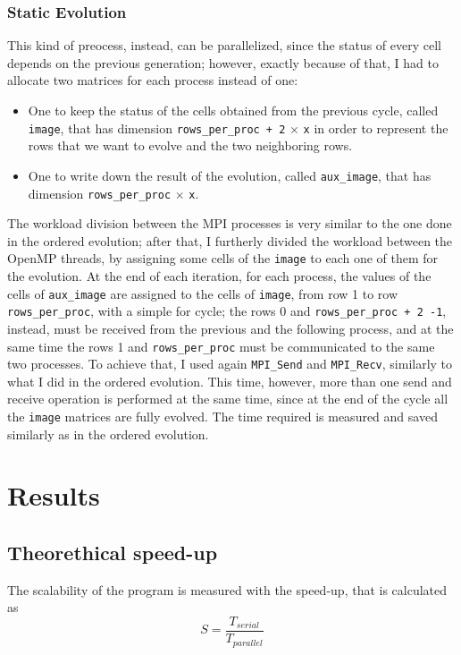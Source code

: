 \documentclass[12pt]{article}
\begin{document}
    \subsubsection{Static Evolution}
    This kind of preocess, instead, can be parallelized, since the status of every cell depends on the previous generation; however, exactly because of that, I had to allocate two matrices for each process instead of one:
    \begin{itemize}
    	\item One to keep the status of the cells obtained from the previous cycle, called \lstinline|image|, that has dimension \lstinline|rows_per_proc + 2| $\times$ \lstinline|x| in order to represent the rows that we want to evolve and the two neighboring rows.
    	\item One to write down the result of the evolution, called \lstinline|aux_image|, that has dimension \lstinline|rows_per_proc| $\times$ \lstinline|x|.
   \end{itemize}
    The workload division between the MPI processes is very  similar to the one done in the ordered evolution; after that, I furtherly divided the workload between the OpenMP threads, by assigning some cells of the \lstinline|image| to each one of them for the evolution.\newline
    At the end of each iteration, for each process, the values of the cells of \lstinline|aux_image| are assigned to the cells of \lstinline|image|, from row 1 to row  \lstinline|rows_per_proc|, with a simple for cycle; the rows 0 and \lstinline|rows_per_proc + 2 -1|, instead, must be received from the previous and the following process, and at the same time the rows 1 and \lstinline|rows_per_proc| must be communicated to the same two processes. To achieve that, I used again  \lstinline|MPI_Send| and \lstinline|MPI_Recv|, similarly to what I did in the ordered evolution. This time, however, more than one send and receive operation is performed at the same time, since at the end of the cycle all the \lstinline|image| matrices are fully evolved.\newline
    The time required is measured and saved similarly as in the ordered evolution.
    
    
\section{Results}
	\subsection{Theorethical speed-up}
	The scalability of the program is measured with the speed-up, that is calculated as
	\begin{equation}
		S = \frac{T_{serial}}{T_{parallel}}
	\end{equation}
	
\end{document}

